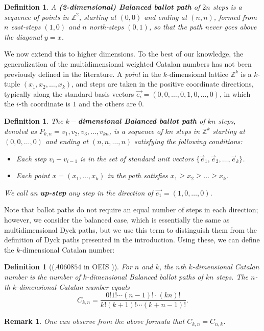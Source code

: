 \documentclass[12pt,notitlepage]{amsart}
\numberwithin{equation}{section}
\theoremstyle{thmstyleone}%
\theoremstyle{thmstyletwo}%
\newtheorem{remark}[theorem]{Remark}%
\theoremstyle{thmstylethree}%
\newtheorem{definition}[theorem]{Definition}%
\numberwithin{theorem}{section}
\numberwithin{equation}{section}
\begin{document}
\begin{definition}
    A \textbf{(2-dimensional) Balanced ballot path} of $2n$ steps is a sequence of points in 
    $\mathbb{Z}^2$, starting at $(0,0)$ and ending at $(n,n)$, formed from $n$ east‐steps $(1,0)$ and $n$ north‐steps $(0,1)$, so that the path never goes above the diagonal $y = x$.
\end{definition}

We now extend this to higher dimensions. To the best of our knowledge, the generalization of the multidimensional weighted Catalan numbers has not been previously defined in the literature. A \textit{point} in the $k$-dimensional lattice $\mathbb{Z}^k$ is a $k$-tuple $(x_1, x_2, \ldots, x_k)$, and steps are taken in the positive coordinate directions, typically along the standard basis vectors $\vec{e_i} = (0,0,\ldots, 0, 1, 0, \ldots, 0)$, in which the $i$-th coordinate is $1$ and the others are $0$. %

\begin{definition}
    The $k-$\textbf{dimensional Balanced ballot path} of $kn$ steps, denoted as $P_{k, n} = v_1, v_2, v_3, \dots, v_{kn}$, is a sequence of $kn$ steps in $\mathbb{Z}^k$ starting at $(0,0,\ldots,0)$ and ending at $(n,n,\ldots,n)$ satisfying the following conditions: 
    \begin{itemize}
        \item Each step $v_i - v_{i-1}$ is in the set of standard unit vectors $\{\vec{e}_1, \vec{e}_2, \dots, \vec{e}_k\}$.
        \item Each point $x = (x_1,\ldots,x_k)$ in the path satisfies $x_1\geq x_2 \geq \ldots \geq x_k$.
    \end{itemize}
    
    We call an \textbf{up-step} any step in the direction of $\vec{e_1} = (1,0,\ldots,0)$. 
\end{definition}

Note that ballot paths do not require an equal number of steps in each direction; however, we consider the balanced case, which is essentially the same as multidimensional Dyck paths, but we use this term to distinguish them from the definition of Dyck paths presented in the introduction. Using these, we can define the $k$-dimensional Catalan number:
\begin{definition}[($A060854$ in OEIS \cite{oeis})]
    For $n$ and $k$, the $n$th $k$-dimensional Catalan number is the number of $k$-dimensional Balanced ballot paths of $kn$ steps. The $n$-th $k$-dimensional Catalan number equals $$C_{k,n} = \frac{0!1!\cdots(n-1)! \cdot (kn)!}{k!(k+1)!\cdots(k+n-1)!}.$$
\end{definition}
\begin{remark}
    One can observe from the above formula that $C_{k, n}= C_{n, k}$.
\end{remark}
\end{document}
